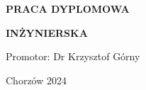 {\begin{titlepage}
\begin{center}
            \vspace*{3.0 cm}
            
            \textbf{\normalsize PRACA DYPLOMOWA}\\

            \vspace*{5px}

            \textbf{\normalsize INŻYNIERSKA}\\

            \vspace*{3.0 cm}

            \begin{flushright}
                \large Promotor: Dr Krzysztof Górny
            \end{flushright}
            
            \vspace*{\fill} %
            
            \small 
            Chorzów 2024
            
        \end{center}
        
        \clearpage
    
    \end{titlepage}

    \restoregeometry
}


\begin{otherlanguage}{polish}
    \maketitle
\end{otherlanguage}
